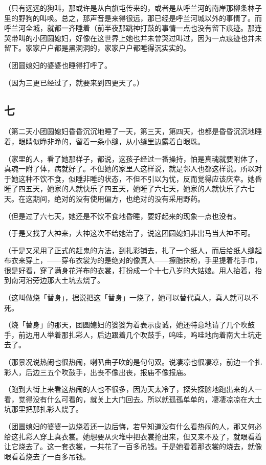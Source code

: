 \documentclass[UTF8]{ctexart}
\begin{document}
（只有远远的狗叫，那或许是从白旗屯传来的，或者是从呼兰河的南岸那柳条林子里的野狗的叫唤。总之，那声音是来得很远，那已经是呼兰河城以外的事情了。而呼兰河全城，就都一齐睡着（前半夜那跳神打鼓的事情一点也没有留下痕迹。那连哭带叫的小团圆媳妇，好像在这世界上她也并未曾哭过叫过，因为一点痕迹也并未留下。家家户户都是黑洞洞的，家家户户都睡得沉实实的。

（团圆媳妇的婆婆也睡得打呼了。

（因为三更已经过了，就要来到四更天了。）

\subsection{七}

（第二天小团圆媳妇昏昏沉沉地睡了一天，第三天，第四天，也都是昏昏沉沉地睡着，眼睛似睁非睁的，留着一条小缝，从小缝里边露着白眼珠。

（家里的人，看了她那样子，都说，这孩子经过一番操持，怕是真魂就要附体了，真魂一附了体，病就好了。不但她的家里人这样说，就是邻人也都这样说。所以对于她这种不饮不食，似睡非睡的状态，不但不引以为忧，反而觉得应该庆幸。她昏睡了四五天，她家的人就快乐了四五天，她睡了六七天，她家的人就快乐了六七天。在这期间，绝对的没有使用偏方，也绝对的没有采用野药。

（但是过了六七天，她还是不饮不食地昏睡，要好起来的现象一点也没有。

（于是又找了大神来，大神这次不给她治了，说这团圆媳妇非出马当大神不可。

（于是又采用了正式的赶鬼的方法，到扎彩铺去，扎了一个纸人，而后给纸人缝起布衣来穿上，——穿布衣裳为的是绝对的像真人——擦脂抹粉，手里提着花手巾，很是好看，穿了满身花洋布的衣裳，打扮成一个十七八岁的大姑娘。用人抬着，抬到南河沿旁边那大土坑去烧了。

（这叫做烧「替身」，据说把这「替身」一烧了，她可以替代真人，真人就可以不死。

（烧「替身」的那天，团圆媳妇的婆婆为着表示虔诚，她还特意地请了几个吹鼓手，前边用人举着那扎彩人，后边跟着几个吹鼓手，呜哇，呜哇地向着南大土坑走去了。

（那景况说热闹也很热闹，喇叭曲子吹的是句句双。说凄凉也很凄凉，前边一个扎彩人，后边三五个吹鼓手，出丧不像出丧，报庙不像报庙。

（跑到大街上来看这热闹的人也不很多，因为天太冷了，探头探脑地跑出来的人一看，觉得没有什么可看的，就关上大门回去。所以就孤孤单单的，凄凄凉凉在大土坑那里把那扎彩人烧了。

（团圆媳妇的婆婆一边烧着还一边后悔，若早知道没有什么看热闹的人，那又何必给这扎彩人穿上真衣裳。她想要从火堆中把衣裳抢出来，但又来不及了，就眼看着让它烧去了。这一套衣裳，一共花了一百多吊钱。于是她看着那衣裳的烧去，就像眼看着烧去了一百多吊钱。
\end{document}
